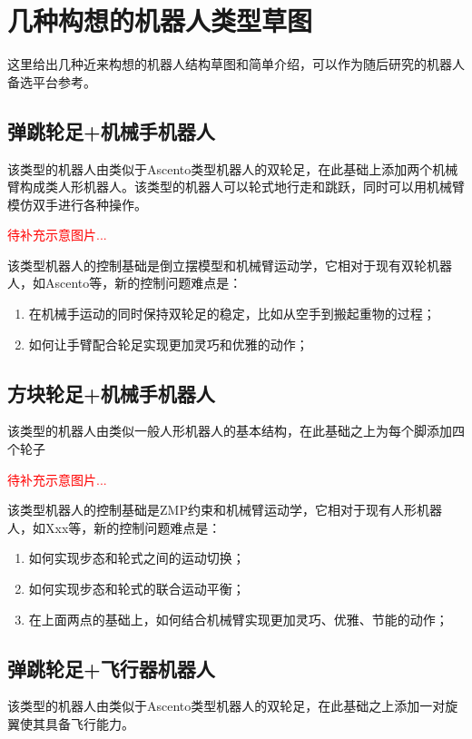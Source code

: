 
\chapter{几种构想的机器人类型草图}
这里给出几种近来构想的机器人结构草图和简单介绍，可以作为随后研究的机器人备选平台参考。
\section[弹跳轮足+机械手机器人]{弹跳轮足+机械手机器人}
该类型的机器人由类似于Ascento\cite[p1]{Klemm_Morra_Salzmann_Tschopp_Bodie_Gulich_Kung_Mannhart_Pfister_Vierneisel_et_al_2019}类型机器人的双轮足，在此基础上添加两个机械臂构成类人形机器人。该类型的机器人可以轮式地行走和跳跃，同时可以用机械臂模仿双手进行各种操作。

\textcolor{red}{\small
待补充示意图片...
}

该类型机器人的控制基础是倒立摆模型和机械臂运动学，它相对于现有双轮机器人，如Ascento\cite[p1]{Klemm_Morra_Salzmann_Tschopp_Bodie_Gulich_Kung_Mannhart_Pfister_Vierneisel_et_al_2019}等，新的控制问题难点是：
\begin{enumerate}
  \item 在机械手运动的同时保持双轮足的稳定，比如从空手到搬起重物的过程；
  \item 如何让手臂配合轮足实现更加灵巧和优雅的动作；
\end{enumerate}

\section[方块轮足+机械手机器人]{方块轮足+机械手机器人}
该类型的机器人由类似一般人形机器人的基本结构，在此基础之上为每个脚添加四个轮子

\textcolor{red}{\small
待补充示意图片...
}

该类型机器人的控制基础是ZMP约束和机械臂运动学，它相对于现有人形机器人，如Xxx等，新的控制问题难点是：
\begin{enumerate}
  \item 如何实现步态和轮式之间的运动切换；
  \item 如何实现步态和轮式的联合运动平衡；
  \item 在上面两点的基础上，如何结合机械臂实现更加灵巧、优雅、节能的动作；
\end{enumerate}

\section[弹跳轮足+飞行器机器人]{弹跳轮足+飞行器机器人}
该类型的机器人由类似于Ascento\cite[p1]{Klemm_Morra_Salzmann_Tschopp_Bodie_Gulich_Kung_Mannhart_Pfister_Vierneisel_et_al_2019}类型机器人的双轮足，在此基础之上添加一对旋翼使其具备飞行能力。

